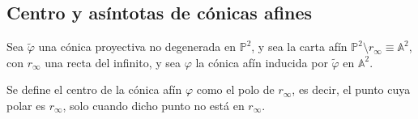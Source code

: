\subsection{Centro y asíntotas de cónicas afines}

Sea $\widetilde{\varphi}$ una cónica proyectiva no degenerada en $\mathbb{P}^2$, y sea la carta afín $\mathbb{P}^2 \setminus r_\infty \equiv \mathbb{A}^2$, con $r_\infty$ una recta del infinito, y sea $\varphi$ la cónica afín inducida por $\widetilde{\varphi}$ en $\mathbb{A}^2$.\\

\begin{definición}
    Se define el centro de la cónica afín $\varphi$ como el polo de $r_\infty$, es decir, el punto cuya polar es $r_\infty$, solo cuando dicho punto no está en $r_\infty$.
\end{definición}

